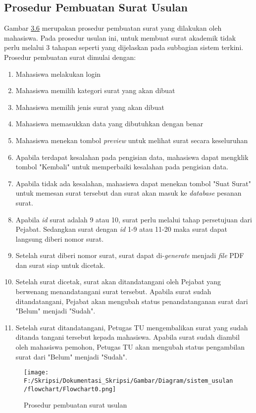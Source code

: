 \subsection{Prosedur Pembuatan Surat Usulan}
\label{sec:pembuatan_surat_usulan}
Gambar \hyperlink{pembuatan_usulan}{3.6} merupakan prosedur pembuatan surat yang dilakukan oleh mahasiswa. Pada prosedur usulan ini, untuk membuat surat akademik tidak perlu melalui 3 tahapan seperti yang dijelaskan pada subbagian sistem terkini. Prosedur pembuatan surat dimulai dengan:
\begin{enumerate}
	\item Mahasiswa melakukan login
	\item Mahasiswa memilih kategori surat yang akan dibuat
	\item Mahasiswa memilih jenis surat yang akan dibuat
	\item Mahasiswa memasukkan data yang dibutuhkan dengan benar
	\item Mahasiswa menekan tombol \textit{preview} untuk melihat surat secara keseluruhan
	\item Apabila terdapat kesalahan pada pengisian data, mahasiswa dapat mengklik tombol "Kembali" untuk memperbaiki kesalahan pada pengisian data.
	\item Apabila tidak ada kesalahan, mahasiswa dapat menekan tombol "Suat Surat" untuk memesan surat tersebut dan surat akan masuk ke \textit{database} pesanan surat.
	\item Apabila \textit{id} surat adalah 9 atau 10, surat perlu melalui tahap persetujuan dari Pejabat. Sedangkan surat dengan \textit{id} 1-9 atau 11-20 maka surat dapat langsung diberi nomor surat.
	\item Setelah surat diberi nomor surat, surat dapat di-\textit{generate} menjadi \textit{file} PDF dan surat siap untuk dicetak.	
	\item Setelah surat dicetak, surat akan ditandatangani oleh Pejabat yang berwenang menandatangani surat tersebut. Apabila surat sudah ditandatangani, Pejabat akan mengubah status penandatanganan surat dari "Belum" menjadi "Sudah".
	\item Setelah surat ditandatangani, Petugas TU mengembalikan surat yang sudah ditanda tangani tersebut kepada mahasiswa. Apabila surat sudah diambil oleh mahasiswa pemohon, Petugas TU akan mengubah status pengambilan surat dari "Belum" menjadi "Sudah".
	\
\end{enumerate}
\begin{figure}[H]
	\centering
		\texttt{[image: F:/Skripsi/Dokumentasi\_Skripsi/Gambar/Diagram/sistem\_usulan/flowchart/Flowchart0.png]}
	{\caption{Prosedur pembuatan surat usulan}}
	\label{fig:pembuatan_usulan}
\end{figure}

